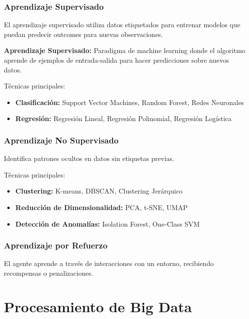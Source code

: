 \subsubsection{Aprendizaje Supervisado}

El aprendizaje supervisado utiliza datos etiquetados para entrenar modelos que puedan predecir outcomes para nuevas observaciones.

\begin{definicion}
\textbf{Aprendizaje Supervisado:} Paradigma de machine learning donde el algoritmo aprende de ejemplos de entrada-salida para hacer predicciones sobre nuevos datos.
\end{definicion}

Técnicas principales:
\begin{itemize}
    \item \textbf{Clasificación:} Support Vector Machines, Random Forest, Redes Neuronales
    \item \textbf{Regresión:} Regresión Lineal, Regresión Polinomial, Regresión Logística
\end{itemize}

\subsubsection{Aprendizaje No Supervisado}

Identifica patrones ocultos en datos sin etiquetas previas.

Técnicas principales:
\begin{itemize}
    \item \textbf{Clustering:} K-means, DBSCAN, Clustering Jerárquico
    \item \textbf{Reducción de Dimensionalidad:} PCA, t-SNE, UMAP
    \item \textbf{Detección de Anomalías:} Isolation Forest, One-Class SVM
\end{itemize}

\subsubsection{Aprendizaje por Refuerzo}

El agente aprende a través de interacciones con un entorno, recibiendo recompensas o penalizaciones.

\section{Procesamiento de Big Data}

